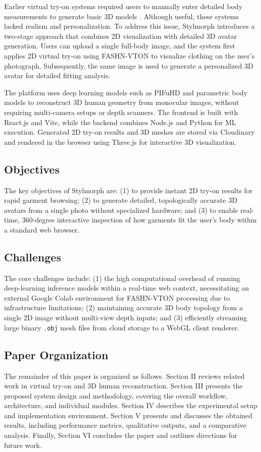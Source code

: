 \documentclass[conference]{IEEEtran}
\begin{document}
Earlier virtual try-on systems required users to manually enter detailed body measurements to generate basic 3D models \cite{b12}. Although useful, these systems lacked realism and personalization. To address this issue, Stylmorph introduces a two-stage approach that combines 2D visualization with detailed 3D avatar generation. Users can upload a single full-body image, and the system first applies 2D virtual try-on using FASHN-VTON \cite{b23} to visualize clothing on the user's photograph. Subsequently, the same image is used to generate a personalized 3D avatar \cite{b4} for detailed fitting analysis.

The platform uses deep learning models such as PIFuHD \cite{b1} and parametric body models \cite{b3} to reconstruct 3D human geometry from monocular images, without requiring multi-camera setups or depth scanners. The frontend is built with React.js and Vite, while the backend combines Node.js and Python for ML execution. Generated 2D try-on results and 3D meshes are stored via Cloudinary and rendered in the browser using Three.js \cite{b8} for interactive 3D visualization.

\subsection{Objectives}
The key objectives of Stylmorph are: (1) to provide instant 2D try-on results for rapid garment browsing; (2) to generate detailed, topologically accurate 3D avatars from a single photo without specialized hardware; and (3) to enable real-time, 360-degree interactive inspection of how garments fit the user's body within a standard web browser.

\subsection{Challenges}
The core challenges include: (1) the high computational overhead of running deep-learning inference models within a real-time web context, necessitating an external Google Colab environment for FASHN-VTON processing due to infrastructure limitations; (2) maintaining accurate 3D body topology from a single 2D image without multi-view depth inputs; and (3) efficiently streaming large binary \texttt{.obj} mesh files from cloud storage to a WebGL client renderer.

\subsection{Paper Organization}
The remainder of this paper is organized as follows. Section II reviews related work in virtual try-on and 3D human reconstruction. Section III presents the proposed system design and methodology, covering the overall workflow, architecture, and individual modules. Section IV describes the experimental setup and implementation environment. Section V presents and discusses the obtained results, including performance metrics, qualitative outputs, and a comparative analysis. Finally, Section VI concludes the paper and outlines directions for future work.
\end{document}
